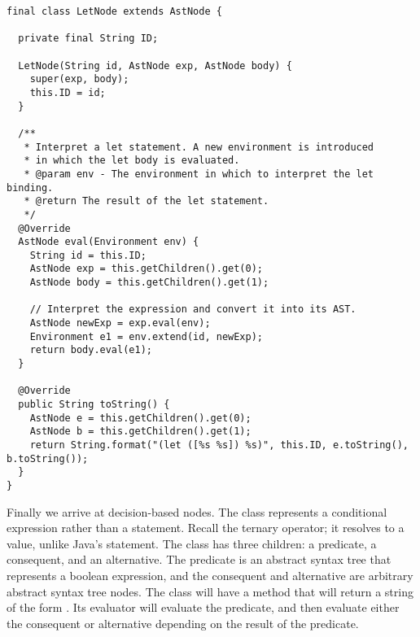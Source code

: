 \begin{lstlisting}[language=MyJava]
final class LetNode extends AstNode {

  private final String ID;

  LetNode(String id, AstNode exp, AstNode body) {
    super(exp, body);
    this.ID = id;
  }

  /**
   * Interpret a let statement. A new environment is introduced 
   * in which the let body is evaluated.
   * @param env - The environment in which to interpret the let binding.
   * @return The result of the let statement.
   */
  @Override
  AstNode eval(Environment env) {
    String id = this.ID;
    AstNode exp = this.getChildren().get(0);
    AstNode body = this.getChildren().get(1);

    // Interpret the expression and convert it into its AST.
    AstNode newExp = exp.eval(env);
    Environment e1 = env.extend(id, newExp);
    return body.eval(e1);
  }

  @Override
  public String toString() {
    AstNode e = this.getChildren().get(0);
    AstNode b = this.getChildren().get(1);
    return String.format("(let ([%s %s]) %s)", this.ID, e.toString(), b.toString());
  }
}
\end{lstlisting}

Finally we arrive at decision-based nodes. The  class represents a conditional expression rather than a statement. Recall the ternary operator; it resolves to a value, unlike Java's  statement. The  class has three children: a predicate, a consequent, and an alternative. The predicate is an abstract syntax tree that represents a boolean expression, and the consequent and alternative are arbitrary abstract syntax tree nodes. The  class will have a  method that will return a string of the form . Its evaluator will evaluate the predicate, and then evaluate either the consequent or alternative depending on the result of the predicate.

